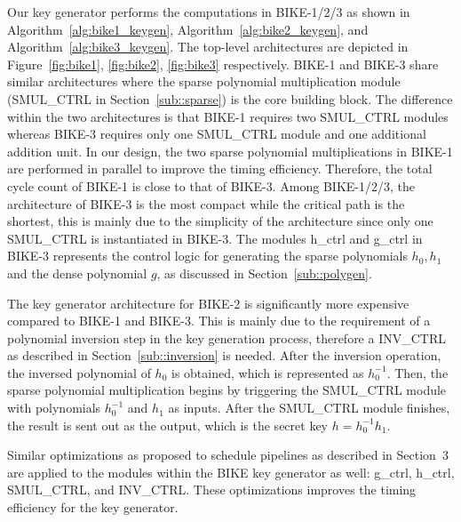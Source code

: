 \documentclass[runningheads]{llncs}
\begin{document}
Our key generator performs the computations in BIKE-1/2/3 as shown in Algorithm~\ref{alg:bike1_keygen}, Algorithm~\ref{alg:bike2_keygen}, and Algorithm~\ref{alg:bike3_keygen}. The top-level architectures are depicted in Figure~\ref{fig:bike1}, \ref{fig:bike2}, \ref{fig:bike3}
respectively.
BIKE-1 and BIKE-3 share similar architectures
where the sparse polynomial multiplication module
(SMUL\_CTRL in Section~\ref{sub::sparse}) is the core building block.
The difference within the two architectures is that
BIKE-1 requires two SMUL\_CTRL modules
whereas BIKE-3 requires only one SMUL\_CTRL module and one additional
addition unit.
In our design, the two sparse polynomial multiplications
in BIKE-1 are performed in parallel to improve the
timing efficiency.
Therefore, the total cycle count of BIKE-1
is close to that of BIKE-3.
Among BIKE-1/2/3, the architecture of BIKE-3 is
the most compact while the critical path is the shortest,
this is mainly due to the simplicity of the architecture
since only one SMUL\_CTRL is instantiated in BIKE-3.
The modules h\_ctrl and g\_ctrl in BIKE-3 represents the
control logic for
generating the sparse polynomials $h_0,h_1$ and
the dense polynomial $g$, as discussed in Section~\ref{sub::polygen}.

The key generator architecture for BIKE-2
is significantly more expensive compared to
BIKE-1 and BIKE-3.
This is mainly due to the requirement of a
polynomial inversion step in the key generation process,
therefore a INV\_CTRL as described in Section~\ref{sub::inversion} is needed.
After the inversion operation, the inversed polynomial of
$h_0$ is obtained, which is represented as $h_0^{-1}$.
Then, the sparse polynomial multiplication begins
by triggering the SMUL\_CTRL module with polynomials
$h_0^{-1}$ and $h_1$ as inputs.
After the SMUL\_CTRL module finishes,
the result is sent out as the output,
which is the secret key $h=h_0^{-1}h_1$.

Similar optimizations as proposed to schedule pipelines
as described in Section~3 are applied to the
modules within the BIKE key generator as well:
g\_ctrl, h\_ctrl, SMUL\_CTRL, and INV\_CTRL.
These optimizations improves the timing efficiency for the
key generator.
\end{document}
